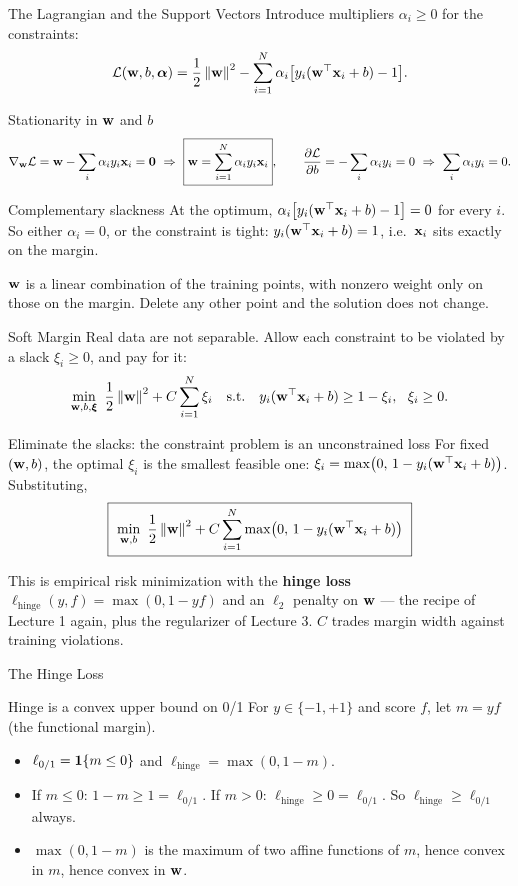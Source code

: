 \documentclass[11pt,aspectratio=169]{beamer}
\begin{document}
\begin{frame}{The Lagrangian and the Support Vectors}\footnotesize
Introduce multipliers $\alpha_i\ge0$ for the constraints:
\[
\mathcal{L}(\mathbf{w},b,\boldsymbol{\alpha})=\frac12\left\lVert \mathbf{w} \right\rVert^2-\sum_{i=1}^N\alpha_i\bigl[y_i(\mathbf{w}^{\top}\mathbf{x}_i+b)-1\bigr].
\]
\begin{derivation}{Stationarity in $\mathbf{w}$ and $b$}
\[
\nabla_{\vw}\Lcal=\vw-\sum_i\alpha_iy_i\vx_i=\vzero\ \Rightarrow\ \boxed{\vw=\sum_{i=1}^N\alpha_iy_i\vx_i},
\qquad
\frac{\partial\Lcal}{\partial b}=-\sum_i\alpha_iy_i=0\ \Rightarrow\ \sum_i\alpha_iy_i=0 .
\]
\end{derivation}
\begin{derivation}{Complementary slackness}
At the optimum, $\alpha_i\bigl[y_i(\mathbf{w}^{\top}\mathbf{x}_i+b)-1\bigr]=0$ for every $i$. So either $\alpha_i=0$, or the constraint
is tight: $y_i(\mathbf{w}^{\top}\mathbf{x}_i+b)=1$, i.e.\ $\mathbf{x}_i$ sits exactly on the margin.
\end{derivation}
\begin{keypoint}
$\mathbf{w}$ is a linear combination of the training points, with nonzero weight only on those on the margin.
Delete any other point and the solution does not change.
\end{keypoint}
\end{frame}

\begin{frame}{Soft Margin}\small
Real data are not separable. Allow each constraint to be violated by a slack $\xi_i\ge0$, and pay for it:
\[
\min_{\vw,b,\vxi}\ \frac12\norm\vw^2+C\sum_{i=1}^N\xi_i
\quad\text{s.t.}\quad y_i(\vw\T\vx_i+b)\ge1-\xi_i,\ \ \xi_i\ge0 .
\]
\begin{derivation}{Eliminate the slacks: the constraint problem is an unconstrained loss}
For fixed $(\mathbf{w},b)$, the optimal $\xi_i$ is the smallest feasible one:
$\xi_i=\max\bigl(0,\,1-y_i(\mathbf{w}^{\top}\mathbf{x}_i+b)\bigr)$. Substituting,
\[
\boxed{\ \min_{\vw,b}\ \frac12\norm\vw^2+C\sum_{i=1}^N\max\bigl(0,\,1-y_i(\vw\T\vx_i+b)\bigr)\ }
\]
\end{derivation}
This is empirical risk minimization with the \textbf{hinge loss} $\ell_{\text{hinge}}(y,f)=\max(0,1-yf)$
and an $\ell_2$ penalty on $\mathbf{w}$ --- the recipe of Lecture 1 again, plus the regularizer of Lecture 3.
$C$ trades margin width against training violations.
\end{frame}

\begin{frame}{The Hinge Loss}
\begin{claim}{Hinge is a convex upper bound on 0/1}
For $y\in\{-1,+1\}$ and score $f$, let $m=yf$ (the functional margin).
\begin{itemize}
  \item $\ell_{0/1}=\mathbf{1}\!\left\{m\le0\right\}$ and $\ell_{\text{hinge}}=\max(0,1-m)$.
  \item If $m\le0$: $1-m\ge1=\ell_{0/1}$. If $m>0$: $\ell_{\text{hinge}}\ge0=\ell_{0/1}$. So $\ell_{\text{hinge}}\ge\ell_{0/1}$ always.
  \item $\max(0,1-m)$ is the maximum of two affine functions of $m$, hence convex in $m$, hence convex in $\mathbf{w}$.
\end{itemize}
\end{claim}
\end{frame}
\end{document}
